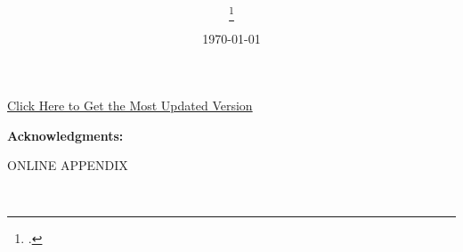 \documentclass[12pt,english]{article}
\begin{document}
\title{
\vspace*{-2em}
\onehalfspacing
\PAPERTITLE
}

\author{
\AUTHORHADAH{} \thanks{
\AUTHORHADAHINFO.
}}

\date{
\vspace*{-1em}
\today
}

\maketitle

\vspace*{-2.75em}
\begin{center}
\href{https://hhadah.github.io/asian-identity-attrition/my_paper/submit_preprint.pdf}{\footnotesize{Click Here to Get the Most Updated Version}}
\end{center}

\thispagestyle{empty}

\vspace*{-0.5em}
\begin{abstract}
\singlespacing
\PAPERABSTRACT
\end{abstract}
\vspace*{-0.5em}
{\small\PAPERKEYWORDS}
\thispagestyle{empty}
\clearpage

\setcounter{page}{1}
\renewcommand*{\thefootnote}{\arabic{footnote}}

\clearpage

\begingroup
{}
\setlength\bibitemsep{5pt}
\printbibliography[title=References]
\endgroup

\newpage
\pagebreak

\vspace{2em}
\noindent\textbf{Acknowledgments:} \ACKNOWLEDGMENTS

\pagebreak



\appendix
\setlength{\footnotemargin}{5.75mm}

\renewcommand*{\thefootnote}{\fnsymbol{footnote}}
\begingroup
  \doublespacing
  \centering
  \Large ONLINE APPENDIX \\
  \LARGE \begin{singlespace}\PAPERTITLE\end{singlespace}
  \large \href{\AUTHORHADAHURL}{\AUTHORHADAH}\\[1.0em]
\endgroup

\newpage

\clearpage
\end{document}
